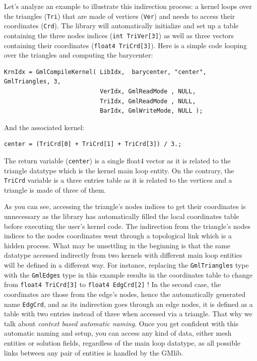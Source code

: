 \documentclass[a4paper,12pt]{article}
\begin{document}
Let's analyze an example to illustrate this indirection process: a kernel loops over the triangles ({\tt Tri}) that are made of vertices ({\tt Ver}) and needs to access their coordinates ({\tt Crd}). The library will automatically initialize and set up a table containing the three nodes indices ({\tt int TriVer[3]}) as well as three vectors containing their coordinates ({\tt float4 TriCrd[3]}). Here is a simple code looping over the triangles and computing the barycenter:

\begin{tt}
\begin{verbatim}
KrnIdx = GmlCompileKernel( LibIdx,  barycenter, "center", GmlTriangles, 3,
                           VerIdx, GmlReadMode , NULL,
                           TriIdx, GmlReadMode , NULL,
                           BarIdx, GmlWriteMode, NULL );
\end{verbatim}
\end{tt}
\normalfont

And the associated kernel:
\begin{tt}
\begin{verbatim}
center = (TriCrd[0] + TriCrd[1] + TriCrd[3]) / 3.;
\end{verbatim}
\end{tt}
\normalfont

The return variable ({\tt center}) is a single float4 vector as it is related to the triangle datatype which is the kernel main loop entity. On the contrary, the {\tt TriCrd} variable is a three entries table as it is related to the vertices and a triangle is made of three of them.

As you can see, accessing the triangle's nodes indices to get their coordinates is unnecessary as the library has automatically filled the local coordinates table before executing the user's kernel code. The indirection from the triangle's nodes indices to the nodes coordinates went through a topological link which is a hidden process. What may be unsettling in the beginning is that the same datatype accessed indirectly from two kernels with different main loop entities will be defined in a different way. For instance, replacing the {\tt GmlTriangles} type with the {\tt GmlEdges} type in this example results in the coordinates table to change from {\tt float4 TriCrd[3]} to {\tt float4 EdgCrd[2]} ! In the second case, the coordinates are those from the edge's nodes, hence the automatically generated name {\tt EdgCrd}, and as its indirection goes through an edge nodes, it is defined as a table with two entries instead of three when accessed via a triangle. That why we talk about \emph{context based automatic naming}. Once you get confident with this automatic naming and setup, you can access any kind of data, either mesh entities or solution fields, regardless of the main loop datatype, as all possible links between any pair of entities is handled by the GMlib.
\end{document}
